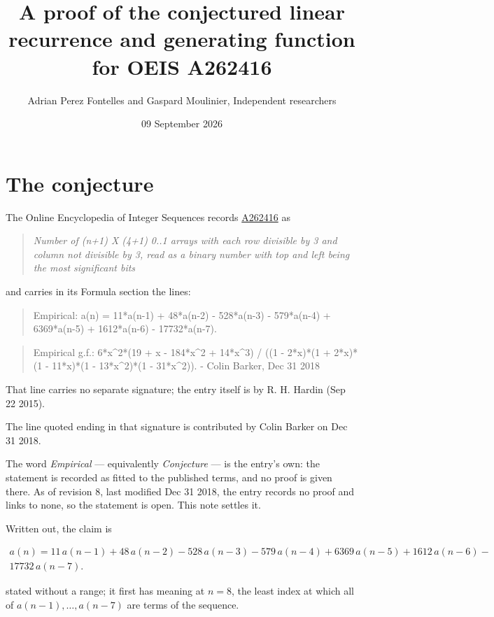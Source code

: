 \documentclass[11pt]{article}
\title{A proof of the conjectured linear recurrence and generating function for OEIS A262416}
\author{Adrian Perez Fontelles and Gaspard Moulinier, Independent researchers}
\date{09 September 2026}
\theoremstyle{definition}
\begin{document}
\maketitle
\section{The conjecture}

The Online Encyclopedia of Integer Sequences records \href{https://oeis.org/A262416}{A262416} as

\begin{quote}\itshape Number of (n+1) X (4+1) 0..1 arrays with each row divisible by 3 and column not divisible by 3, read as a binary number with top and left being the most significant bits\end{quote}

and carries in its Formula section the lines:

\begin{quote}\ttfamily Empirical: a(n) = 11*a(n-1) + 48*a(n-2) - 528*a(n-3) - 579*a(n-4) + 6369*a(n-5) + 1612*a(n-6) - 17732*a(n-7).\end{quote}

\begin{quote}\ttfamily Empirical g.f.: 6*x\textasciicircum{}2*(19 + x - 184*x\textasciicircum{}2 + 14*x\textasciicircum{}3) / ((1 - 2*x)*(1 + 2*x)*(1 - 11*x)*(1 - 13*x\textasciicircum{}2)*(1 - 31*x\textasciicircum{}2)). - Colin Barker, Dec 31 2018\end{quote}

That line carries no separate signature; the entry itself is by R. H. Hardin (Sep 22 2015).

The line quoted ending in that signature is contributed by Colin Barker on Dec 31 2018.

The word {\itshape Empirical} --- equivalently {\itshape Conjecture} --- is the entry's own: the statement is recorded as fitted to the published terms, and no proof is given there. As of revision 8, last modified Dec 31 2018, the entry records no proof and links to none, so the statement is open. This note settles it.

Written out, the claim is

\begin{multline*} a(n) = 11\,a(n-1) + 48\,a(n-2) - 528\,a(n-3) - 579\,a(n-4) + 6369\,a(n-5) + 1612\,a(n-6) - \\ 17732\,a(n-7). \end{multline*}

stated without a range; it first has meaning at $n = 8$, the least index at which all of $a(n-1),\dots,a(n-7)$ are terms of the sequence.
\end{document}
